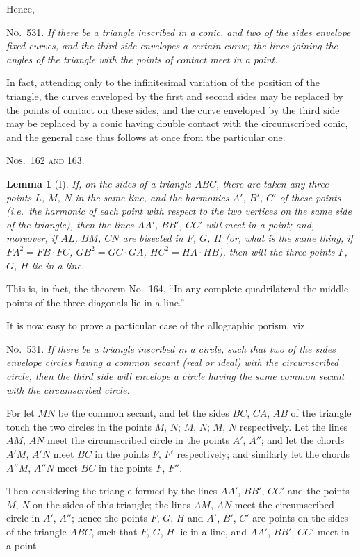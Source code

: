 \documentclass[12pt,a4paper]{article}
\theoremstyle{plain}
\newtheorem{lemma}{Lemma}
\theoremstyle{definition}
\begin{document}
Hence,

\textsc{No.~531.} \textit{If there be a triangle inscribed in a conic, and two of the sides envelope fixed curves, and the third side envelopes a certain curve; the lines joining the angles of the triangle with the points of contact meet in a point.}

In fact, attending only to the infinitesimal variation of the position of the triangle, the curves enveloped by the first and second sides may be replaced by the points of contact on these sides, and the curve enveloped by the third side may be replaced by a conic having double contact with the circumscribed conic, and the general case thus follows at once from the particular one.

\textsc{Nos.~162 and 163.}

\begin{lemma}[I]
If, on the sides of a triangle $ABC$, there are taken any three points $L$, $M$, $N$ in the same line, and the harmonics $A'$, $B'$, $C'$ of these points (i.e.\ the harmonic of each point with respect to the two vertices on the same side of the triangle), then the lines $AA'$, $BB'$, $CC'$ will meet in a point; and, moreover, if $AL$, $BM$, $CN$ are bisected in $F$, $G$, $H$ (or, what is the same thing, if $FA^2 = FB \cdot FC$, $GB^2 = GC \cdot GA$, $HC^2 = HA \cdot HB$), then will the three points $F$, $G$, $H$ lie in a line.
\end{lemma}

This is, in fact, the theorem No.~164, ``In any complete quadrilateral the middle points of the three diagonals lie in a line.''

It is now easy to prove a particular case of the allographic porism, viz.

\textsc{No.~531.} \textit{If there be a triangle inscribed in a circle, such that two of the sides envelope circles having a common secant (real or ideal) with the circumscribed circle, then the third side will envelope a circle having the same common secant with the circumscribed circle.}

For let $MN$ be the common secant, and let the sides $BC$, $CA$, $AB$ of the triangle touch the two circles in the points $M$, $N$; $M$, $N$; $M$, $N$ respectively. Let the lines $AM$, $AN$ meet the circumscribed circle in the points $A'$, $A''$; and let the chords $A'M$, $A'N$ meet $BC$ in the points $F$, $F'$ respectively; and similarly let the chords $A''M$, $A''N$ meet $BC$ in the points $F$, $F''$.

Then considering the triangle formed by the lines $AA'$, $BB'$, $CC'$ and the points $M$, $N$ on the sides of this triangle; the lines $AM$, $AN$ meet the circumscribed circle in $A'$, $A''$; hence the points $F$, $G$, $H$ and $A'$, $B'$, $C'$ are points on the sides of the triangle $ABC$, such that $F$, $G$, $H$ lie in a line, and $AA'$, $BB'$, $CC'$ meet in a point.
\end{document}
